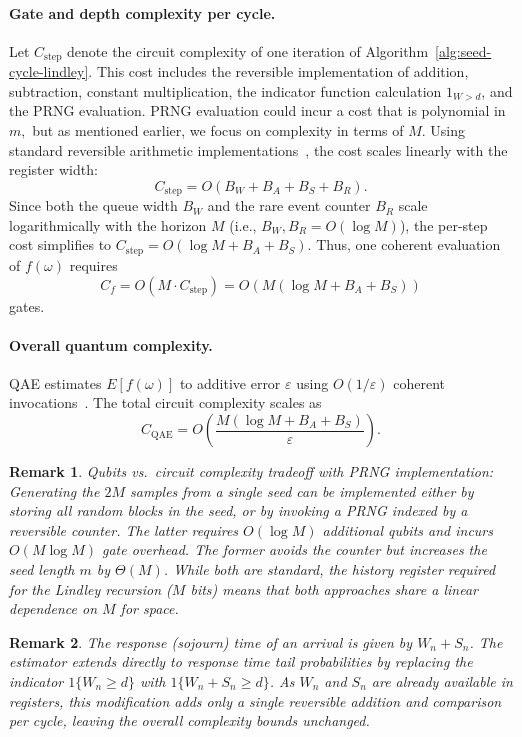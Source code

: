 \documentclass[11pt]{article}
\newtheorem{remark}{Remark}
\begin{document}
\paragraph{Gate and depth complexity per cycle.}
Let $C_{\mathrm{step}}$ denote the circuit complexity of one iteration of
Algorithm~\ref{alg:seed-cycle-lindley}.
This cost includes the reversible implementation of addition, subtraction, constant multiplication, the indicator function calculation $1_{W > d}$, and the PRNG evaluation.
PRNG evaluation could incur a cost that is polynomial in $m,$ but as mentioned earlier, we focus on complexity in terms of $M.$ Using standard reversible arithmetic implementations~\cite{cuccaro2004adder,vedral1996}, the cost scales linearly with the register width:
\[
C_{\mathrm{step}} = O(B_W + B_A + B_S + B_R).
\]
Since both the queue width $B_W$ and the rare event counter $B_R$ scale logarithmically with the horizon $M$ (i.e., $B_W, B_R = O(\log M)$), the per-step cost simplifies to $C_{\mathrm{step}} = O(\log M + B_A + B_S)$.
Thus, one coherent evaluation of $f(\omega)$ requires
\[
C_f = O(M \cdot C_{\mathrm{step}}) = O(M (\log M + B_A + B_S))
\]
gates.
\paragraph{Overall quantum complexity.}
QAE estimates $E[f(\omega)]$ to additive error
$\varepsilon$ using $O(1/\varepsilon)$ coherent invocations~\cite{brassard2002quantum}.
The total circuit complexity scales as
\[
C_{\mathrm{QAE}} = O\!\left( \frac{M (\log M + B_A + B_S)}{\varepsilon} \right).
\]

\begin{remark}
\textit{Qubits vs.\ circuit complexity tradeoff with PRNG implementation:}
Generating the $2M$ samples from a single seed can be implemented either by storing all random blocks in the seed, or by invoking a PRNG indexed by a reversible counter.
The latter requires $O(\log M)$ additional qubits and incurs $O(M\log M)$ gate overhead.
The former avoids the counter but increases the seed length $m$ by $\Theta(M)$.
While both are standard, the history register required for the Lindley recursion ($M$ bits) means that both approaches share a linear dependence on $M$ for space.
\end{remark}

\begin{remark}
The response (sojourn) time of an arrival is given by $W_n + S_n$.
The estimator extends directly to response time tail probabilities by replacing the indicator ${1}\{W_n \ge d\}$ with ${1}\{W_n + S_n \ge d\}$.
As $W_n$ and $S_n$ are already available in registers, this modification adds only a single reversible addition and comparison per cycle, leaving the overall complexity bounds unchanged.
\end{remark}
\end{document}
